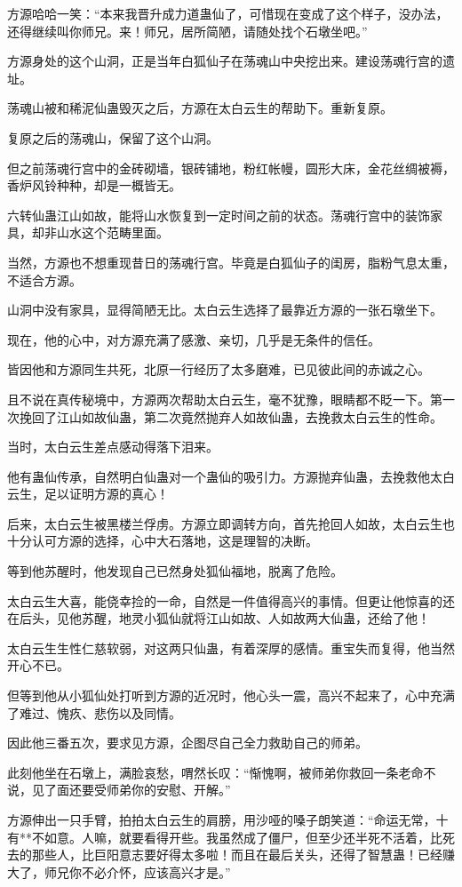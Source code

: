 \begin{this_body}
方源哈哈一笑：“本来我晋升成力道蛊仙了，可惜现在变成了这个样子，没办法，还得继续叫你师兄。来！师兄，居所简陋，请随处找个石墩坐吧。”

方源身处的这个山洞，正是当年白狐仙子在荡魂山中央挖出来。建设荡魂行宫的遗址。

荡魂山被和稀泥仙蛊毁灭之后，方源在太白云生的帮助下。重新复原。

复原之后的荡魂山，保留了这个山洞。

但之前荡魂行宫中的金砖砌墙，银砖铺地，粉红帐幔，圆形大床，金花丝绸被褥，香炉风铃种种，却是一概皆无。

六转仙蛊江山如故，能将山水恢复到一定时间之前的状态。荡魂行宫中的装饰家具，却非山水这个范畴里面。

当然，方源也不想重现昔日的荡魂行宫。毕竟是白狐仙子的闺房，脂粉气息太重，不适合方源。

山洞中没有家具，显得简陋无比。太白云生选择了最靠近方源的一张石墩坐下。

现在，他的心中，对方源充满了感激、亲切，几乎是无条件的信任。

皆因他和方源同生共死，北原一行经历了太多磨难，已见彼此间的赤诚之心。

且不说在真传秘境中，方源两次帮助太白云生，毫不犹豫，眼睛都不眨一下。第一次挽回了江山如故仙蛊，第二次竟然抛弃人如故仙蛊，去挽救太白云生的性命。

当时，太白云生差点感动得落下泪来。

他有蛊仙传承，自然明白仙蛊对一个蛊仙的吸引力。方源抛弃仙蛊，去挽救他太白云生，足以证明方源的真心！

后来，太白云生被黑楼兰俘虏。方源立即调转方向，首先抢回人如故，太白云生也十分认可方源的选择，心中大石落地，这是理智的决断。

等到他苏醒时，他发现自己已然身处狐仙福地，脱离了危险。

太白云生大喜，能侥幸捡的一命，自然是一件值得高兴的事情。但更让他惊喜的还在后头，见他苏醒，地灵小狐仙就将江山如故、人如故两大仙蛊，还给了他！

太白云生生性仁慈软弱，对这两只仙蛊，有着深厚的感情。重宝失而复得，他当然开心不已。

但等到他从小狐仙处打听到方源的近况时，他心头一震，高兴不起来了，心中充满了难过、愧疚、悲伤以及同情。

因此他三番五次，要求见方源，企图尽自己全力救助自己的师弟。

此刻他坐在石墩上，满脸哀愁，喟然长叹：“惭愧啊，被师弟你救回一条老命不说，见了面还要受师弟你的安慰、开解。”

方源伸出一只手臂，拍拍太白云生的肩膀，用沙哑的嗓子朗笑道：“命运无常，十有**不如意。人嘛，就要看得开些。我虽然成了僵尸，但至少还半死不活着，比死去的那些人，比巨阳意志要好得太多啦！而且在最后关头，还得了智慧蛊！已经赚大了，师兄你不必介怀，应该高兴才是。”


\end{this_body}
